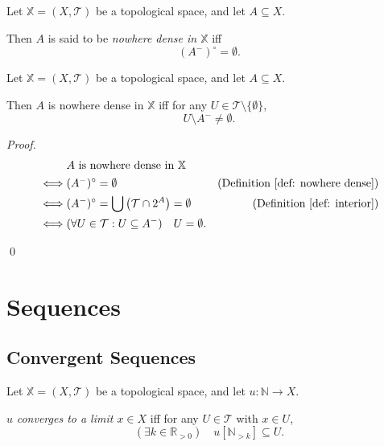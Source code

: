 \begin{definition}
	\label{def: nowhere dense}
	Let $\mathbb X = (X, \mathcal T)$ be a topological space, and let $A \subseteq X$.
	
	Then $A$ is said to be \textit{nowhere dense in $\mathbb X$} iff
	$$
	\left( A^- \right)^\circ = \emptyset.
	$$
\end{definition}


\begin{proposition}
	Let $\mathbb X = (X, \mathcal T)$ be a topological space, and let $A \subseteq X$.
	
	Then $A$ is nowhere dense in $\mathbb X$ iff for any $U \in \mathcal T \setminus \{\emptyset\}$,
	$$
	U \setminus A^- \ne \emptyset.
	$$
	
	\begin{proof}
		$$
		\begin{aligned}
			& \text{$A$ is nowhere dense in $\mathbb X$} \\
			\iff & (A^-)^\circ = \emptyset 
				& \text{(Definition \ref{def: nowhere dense})}\\
			\iff & (A^-)^\circ = \bigcup \left( \mathcal T \cap 2^A \right) = \emptyset 
				& \text{(Definition \ref{def: interior})} \\
			\iff & (\forall U \in \mathcal T: U \subseteq A^-) \quad U = \emptyset.
		\end{aligned}
		$$
		
		\qed
	\end{proof}
\end{proposition}


\chapter{Sequences}


\section{Convergent Sequences}


\begin{definition}
	\label{def: convergent sequence}
	Let $\mathbb X = (X, \mathcal T)$ be a topological space, and let $u: \mathbb N \to X$.
	
	$u$ \textit{converges to a limit $x \in X$} iff for any $U \in \mathcal T$ with $x \in U$,
	$$
	(\exists k \in \mathbb R_{> 0}) \quad u[\mathbb N_{> k}] \subseteq U.
	$$
\end{definition}


